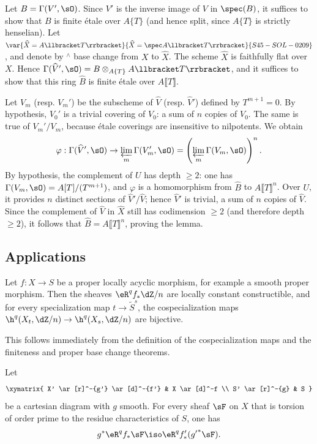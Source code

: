 Let $B=\Gamma(V',\sO)$. Since $V'$ is the inverse image of $V$ in
$\spec(B)$, it suffices to show that $B$ is finite étale over $A\{T\}$
(and hence split, since $A\{T\}$ is strictly henselian). Let
$\var{\widehat X=A\llbracket T\rrbracket}{\widehat X=\spec A\llbracket T\rrbracket}{S45-SOL-0209}$, and denote by ${}^\wedge$ base
change from $X$ to $\widehat X$. The scheme $\widehat X$ is faithfully
flat over $X$. Hence
$\Gamma(\widehat V',\sO)=B\otimes_{A\{T\}}A\llbracket T\rrbracket$,
and it suffices to show that this ring $\widehat B$ is finite étale over
$A\llbracket T\rrbracket$.

Let $V_m$ (resp. $V_m'$) be the subscheme of $\widehat V$ (resp.
$\widehat V'$) defined by $T^{m+1}=0$. By hypothesis, $V_0'$ is a
trivial covering of $V_0$: a sum of $n$ copies of $V_0$. The same is true
of $V_m'/V_m$, because étale coverings are insensitive to nilpotents.
We obtain
\[
  \varphi : \Gamma(\widehat V',\sO) \to \varprojlim_m \Gamma(V_m',\sO) = \left(\varprojlim_m \Gamma(V_m,\sO)\right)^n \text{.}
\]
By hypothesis, the complement of $U$ has depth $\geqslant2$: one has
$\Gamma(V_m,\sO)=A[T]/(T^{m+1})$, and $\varphi$ is a homomorphism from
$\widehat B$ to $A\llbracket T\rrbracket^n$. Over $U$, it provides $n$
distinct sections of $\widehat V'/\widehat V$; hence $\widehat V'$ is
trivial, a sum of $n$ copies of $\widehat V$. Since the complement of
$\widehat V$ in $\widehat X$ still has codimension $\geqslant2$ (and
therefore depth $\geqslant2$), it follows that
$\widehat B=A\llbracket T\rrbracket^n$, proving the lemma.

\subsection{Applications}\label{I:5-3}

\begin{theorem}\label{I:5-3-1}
Let $f:X\to S$ be a proper locally acyclic morphism, for example a smooth
proper morphism. Then the sheaves $\eR^qf_*\dZ/n$ are locally constant
constructible, and for every specialization map $t\to\widetilde S^s$,
the cospecialization maps
$\h^q(X_t,\dZ/n)\to\h^q(X_s,\dZ/n)$ are bijective.
\end{theorem}

This follows immediately from the definition of the cospecialization maps
and the finiteness and proper base change theorems.

\begin{theorem}\label{I:5-3-2}
Let
\[\xymatrix{
  X' \ar[r]^-{g'} \ar[d]^-{f'}
    & X \ar[d]^-f \\
  S' \ar[r]^-{g}
    & S
}\]
be a cartesian diagram with $g$ smooth. For every sheaf $\sF$ on $X$
that is torsion of order prime to the residue characteristics of $S$,
one has
\[
  g^* \eR^q f_* \sF \iso \eR^q f'_*({g'}^* \sF) \text{.}
\]
\end{theorem}


